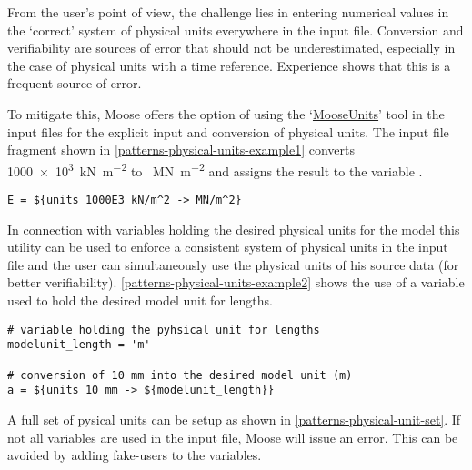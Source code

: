 From the user's point of view, the challenge lies in entering numerical values
in the ‘correct’ system of physical units everywhere in the input file.
Conversion and verifiability are sources of error that should not be
underestimated, especially in the case of physical units with a time reference.
Experience shows that this is a frequent source of error.

To mitigate this, Moose offers the option of using the
‘\href{https://mooseframework.inl.gov/source/utils/Units.html}{MooseUnits}’
tool in the input files for the explicit input and conversion of physical
units. The input file fragment shown in
\autoref{patterns-physical-units-example1} converts \SI{1000e3}{\kN\per\m^2} to
\SI{}{\MN\per\m^2} and assigns the result to the variable .

\begin{lstlisting}[language=Moose, caption={Converting \SI{1000e3}{\kN\per\m^2} into
    \SI{}{\MN\per\m^2}},label={patterns-physical-units-example1}]
E = ${units 1000E3 kN/m^2 -> MN/m^2}
\end{lstlisting}

In connection with variables holding the desired physical units for the model
this utility can be used to enforce a consistent system of physical units in
the input file and the user can simultaneously use the physical units of his
source data (for better verifiability).
\autoref{patterns-physical-units-example2} shows the use of a variable used to
hold the desired model unit for lengths.

\begin{lstlisting}[language=Moose, caption={Using a variable to hold the physical unit for lengths},label={patterns-physical-units-example2}]
# variable holding the pyhsical unit for lengths
modelunit_length = 'm'

# conversion of 10 mm into the desired model unit (m)
a = ${units 10 mm -> ${modelunit_length}}
\end{lstlisting}

A full set of pysical units can be setup as shown in
\autoref{patterns-physical-unit-set}. If not all variables are used in the
input file, Moose will issue an error. This can be avoided by adding fake-users
to the variables.

